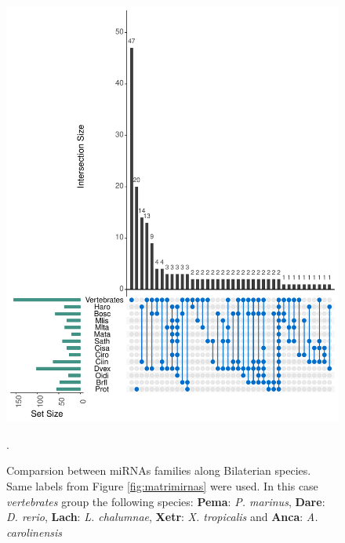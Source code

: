 \documentclass[11pt]{article}
\begin{document}
\begin{figure}[ht!]
\centering
\includegraphics[scale=0.5]{./Images/vennmiRNAs.pdf}
\caption{Comparsion between miRNAs families along Bilaterian species. Same 
labels from Figure \ref{fig:matrimirnas} were used. In this case 
\textsl{vertebrates} group the following species: \textbf{Pema}: \textit{P. 
marinus}, \textbf{Dare}: \textit{D. rerio}, \textbf{Lach}: \textit{L. 
chalumnae}, 
\textbf{Xetr}: \textit{X. tropicalis} and \textbf{Anca}: \textit{A. 
carolinensis}}.
\label{fig:venn}
\end{figure}


\newpage



\end{document}
